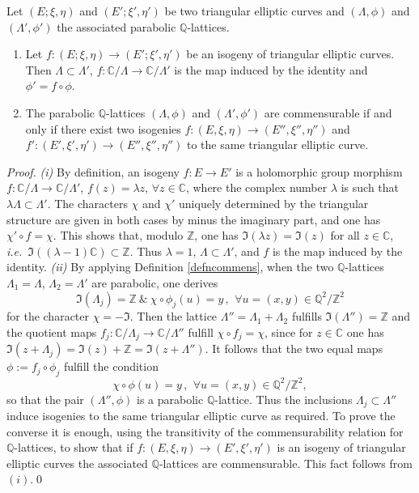 \documentclass[graybox, envcountsect%
]{svmult}
\def\C{{\mathbb C}}
\def\Q{{\mathbb Q}}
\def\Z{{\mathbb Z}}
\def\qqq{\,,\,~\forall}
\newcommand{\ie}{{\it i.e.\/}\ }
\begin{document}
\begin{proposition}\label{isogenies1} Let $(E;\xi,\eta)$ and $(E';\xi',\eta')$ be two triangular elliptic curves and $(\Lambda,\phi)$ and $(\Lambda',\phi')$ the associated parabolic $\Q$-lattices.\begin{enumerate}
\item[(i)] Let $f:(E;\xi,\eta)\to (E';\xi',\eta')$ be an isogeny of triangular elliptic curves. Then $\Lambda\subset \Lambda'$, $f:\C/\Lambda\to \C/\Lambda'$ is the  map induced by the identity and $\phi'=f\circ \phi$.	
\item[(ii)] The parabolic  $\Q$-lattices $(\Lambda,\phi)$ and $(\Lambda',\phi')$ are commensurable if and only if there exist two isogenies $f:(E,\xi,\eta)\to (E'',\xi'',\eta'')$ and $f':(E',\xi',\eta')\to (E'',\xi'',\eta'')$ to the same triangular elliptic curve.
\end{enumerate}
\end{proposition}
\begin{proof} {\it (i)} By definition, an isogeny $f:E\to E'$ is a holomorphic group morphism $f:\C/\Lambda\to \C/\Lambda'$, $f(z)=\lambda z$, $\forall z\in \C$, where the complex number $\lambda$ is such that $\lambda\Lambda\subset\Lambda'$. The characters $\chi$ and $\chi'$ uniquely determined by the triangular structure are given in both cases by minus the imaginary part, and one has $\chi'\circ f=\chi$. This shows that, modulo $\Z$, one has $\Im(\lambda z)=\Im(z)$ for all $z\in \C$, \ie $\Im((\lambda-1)\C)\subset \Z$. Thus $\lambda =1$, $\Lambda\subset \Lambda'$, and  $f$ is the  map induced by the identity.\newline
{\it (ii)} By applying Definition \ref{defncommens}, 
when the two $\Q$-lattices $\Lambda_1=\Lambda$, $\Lambda_2=\Lambda'$ are parabolic, one derives 
$$
\Im(\Lambda_j)=\Z \ \&  \ \chi\circ \phi_j(u)=y \qqq u=(x,y)\in \Q^2/\Z^2
$$
for the character $\chi=-\Im$. Then  the lattice $\Lambda''=\Lambda_1 + \Lambda_2$ fulfills $\Im(\Lambda'')=\Z$ and  the quotient maps $f_j:\C/\Lambda_j\to \C/\Lambda''$ fulfill $\chi\circ f_j=\chi$, since for $z\in \C$ one has $\Im(z+ \Lambda_j)=\Im(z)+\Z=\Im(z+ \Lambda'')$. It follows that the two equal maps 
$\phi:=f_j\circ \phi_j$ fulfill the condition 
$$
\chi\circ \phi(u)=y \qqq u=(x,y)\in \Q^2/\Z^2,
$$
so that the pair $(\Lambda'',\phi)$ is a parabolic $\Q$-lattice. Thus the inclusions $\Lambda_j\subset \Lambda''$ induce isogenies to the same triangular elliptic curve as required.  To prove the converse it is enough, using the transitivity of the commensurability relation for $\Q$-lattices, to show that if $f:(E,\xi,\eta)\to (E',\xi',\eta')$ is an isogeny of triangular elliptic curves the associated $\Q$-lattices are commensurable. This fact follows from $(i)$.\qed
\end{proof} 
\end{document}
